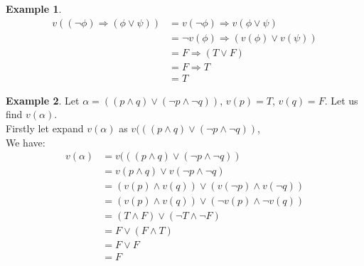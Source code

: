 \documentclass[11pt]{article}
\theoremstyle{definition}
\newtheorem{eg}{Example}[subsection]
\begin{document}
\begin{eg}
    \begin{equation}
        \begin{split}
             v((\neg \phi) \Rightarrow (\phi \vee \psi)) &= v(\neg \phi) \Rightarrow v(\phi \vee \psi)\\
                                                           &= \neg v(\phi) \Rightarrow (v(\phi) \vee v(\psi))\\
                                                           &= F \Rightarrow (T \vee F)\\
                                                           &= F \Rightarrow T\\
                                                           &= T
        \end{split}
    \end{equation}    
\end{eg}

\begin{eg}
    Let $\alpha = ((p \wedge q) \vee (\neg p \wedge \neg q))$, $v(p)=T$, $v(q)=F$. Let us find $v(\alpha)$.\\
    Firstly let expand $v(\alpha)$ as $v(((p \wedge q) \vee (\neg p \wedge \neg q))$,\\
    We have:
    \begin{equation}
        \begin{split}
            v(\alpha)&= v(((p \wedge q) \vee (\neg p \wedge \neg q)) \\
                     &= v(p \wedge q) \vee v(\neg p \wedge \neg q)\\
                     &= (v(p) \wedge v(q)) \vee (v(\neg p) \wedge v(\neg q))\\
                     &= (v(p) \wedge v(q)) \vee (\neg v(p) \wedge \neg v(q))\\
                     &= (T \wedge F) \vee (\neg T \wedge \neg F)\\
                     &= F \vee (F \wedge T)\\
                     &= F \vee F\\
                     &= F
        \end{split}
    \end{equation}
\end{eg}
\end{document}
